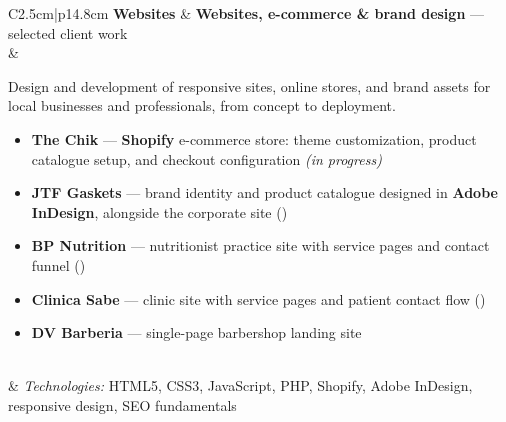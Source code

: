 \begin{longtable}{C{2.5cm}|p{14.8cm}}
	\textbf{Websites} & \textbf{Websites, e-commerce \& brand design} --- selected client work\\&
	\footnotesize{
		Design and development of responsive sites, online stores, and brand assets for local
		businesses and professionals, from concept to deployment.
		\begin{itemize}
			\item \textbf{The Chik} --- \textbf{Shopify} e-commerce store: theme customization, product catalogue setup, and checkout configuration \footnotesize{\emph{(in progress)}}
			\item \textbf{JTF Gaskets} --- brand identity and product catalogue designed in \textbf{Adobe InDesign}, alongside the corporate site \footnotesize{()}
			\item \textbf{BP Nutrition} --- nutritionist practice site with service pages and contact funnel \footnotesize{()}
			\item \textbf{Clinica Sabe} --- clinic site with service pages and patient contact flow \footnotesize{()}
			\item \textbf{DV Barberia} --- single-page barbershop landing site
		\end{itemize}
		\vspace{-1em}
	}\\&
	\footnotesize{\emph{Technologies:} HTML5, CSS3, JavaScript, PHP, Shopify, Adobe InDesign, responsive design, SEO fundamentals}\\

\end{longtable}
